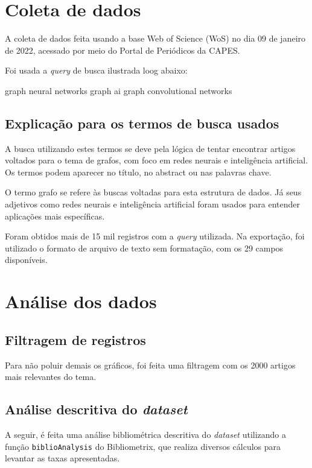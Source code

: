 \section{Coleta de dados\label{MASSA:coleta}}

A coleta de dados feita usando a base Web of Science (WoS) no dia 09 de janeiro de 2022, acessado por meio do Portal de Periódicos da CAPES.

Foi usada a \textit{query} de busca ilustrada loog abaixo:

graph neural networks
graph ai
graph convolutional networks

\subsection{Explicação para os termos de busca usados\label{sec:titofrota:query}}

A busca utilizando estes termos se deve pela lógica de tentar encontrar artigos voltados para o tema de grafos, com foco em redes neurais e inteligência artificial. Os termos podem aparecer no título, no abstract ou nas palavras chave.

O termo grafo se refere às buscas voltadas para esta estrutura de dados. Já seus adjetivos como redes neurais e inteligência artificial foram usados para entender aplicações mais específicas.

Foram obtidos mais de 15 mil registros com a \textit{query} utilizada. Na exportação, foi utilizado o formato de arquivo de texto sem formatação, com os 29 campos disponíveis.

\section{Análise dos dados}

\subsection{Filtragem de registros}

Para não poluir demais os gráficos, foi feita uma filtragem com os 2000 artigos mais relevantes do tema.

\subsection{Análise descritiva do \textit{dataset} }

A seguir, é feita uma análise bibliométrica descritiva do \textit{dataset} utilizando a função \texttt{biblioAnalysis} do Bibliometrix, que realiza diversos cálculos para levantar as taxas apresentadas.

